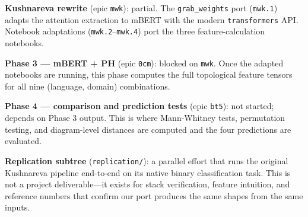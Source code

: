\textbf{Kushnareva rewrite} (epic \texttt{mwk}): partial. The \texttt{grab\_weights} port (\texttt{mwk.1}) adapts the attention extraction to mBERT with the modern \texttt{transformers} API. Notebook adaptations (\texttt{mwk.2}--\texttt{mwk.4}) port the three feature-calculation notebooks.

\textbf{Phase 3 --- mBERT + PH} (epic \texttt{0cm}): blocked on \texttt{mwk}. Once the adapted notebooks are running, this phase computes the full topological feature tensors for all nine (language, domain) combinations.

\textbf{Phase 4 --- comparison and prediction tests} (epic \texttt{bt5}): not started; depends on Phase 3 output. This is where Mann-Whitney tests, permutation testing, and diagram-level distances are computed and the four predictions are evaluated.

\textbf{Replication subtree} (\texttt{replication/}): a parallel effort that runs the original Kushnareva pipeline end-to-end on its native binary classification task. This is not a project deliverable---it exists for stack verification, feature intuition, and reference numbers that confirm our port produces the same shapes from the same inputs.

